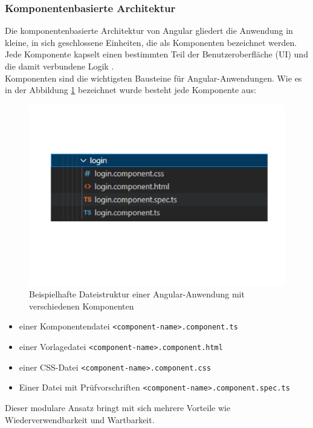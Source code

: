 \subsubsection{Komponentenbasierte Architektur}

Die komponentenbasierte Architektur von Angular gliedert die Anwendung in kleine, in sich geschlossene Einheiten, die als Komponenten bezeichnet werden. Jede Komponente kapselt einen bestimmten Teil der Benutzeroberfläche (UI) und die damit verbundene Logik \cite{Angular2:2024}.\\
Komponenten sind die wichtigsten Bausteine für Angular-Anwendungen. Wie es in der Abbildung \ref{a1} bezeichnet wurde besteht jede Komponente aus: 

\begin{figure} [h]
	\centering
	\includegraphics[scale=0.30]{images/Components.pdf}
	\caption{Beispielhafte Dateistruktur einer Angular-Anwendung mit verschiedenen Komponenten}
	\label{a1}
\end{figure}

\begin{itemize}
	\item einer Komponentendatei \texttt{<component-name>.component.ts}
	\item einer Vorlagedatei \texttt{<component-name>.component.html}
	\item einer CSS-Datei \texttt{<component-name>.component.css}
	\item Einer Datei mit Prüfvorschriften \texttt{<component-name>.component.spec.ts}
\end{itemize}


Dieser modulare Ansatz bringt mit sich mehrere Vorteile wie Wiederverwendbarkeit und Wartbarkeit.

